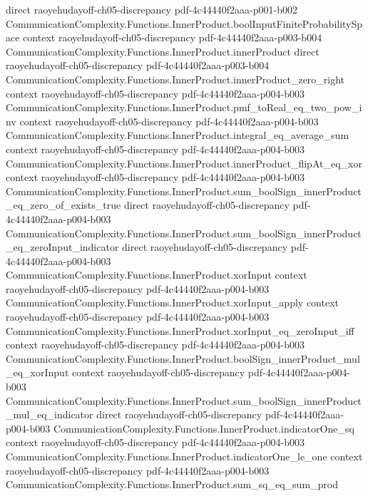 \begin{lemma}
  {direct}
  {raoyehudayoff-ch05-discrepancy}
  {pdf-4c44440f2aaa-p001-b002}
\proofstep
  {CommunicationComplexity.Functions.InnerProduct.boolInputFiniteProbabilitySpace}
  {context}
  {raoyehudayoff-ch05-discrepancy}
  {pdf-4c44440f2aaa-p003-b004}
\proofstep
  {CommunicationComplexity.Functions.InnerProduct.innerProduct}
  {direct}
  {raoyehudayoff-ch05-discrepancy}
  {pdf-4c44440f2aaa-p003-b004}
\proofstep
  {CommunicationComplexity.Functions.InnerProduct.innerProduct_zero_right}
  {context}
  {raoyehudayoff-ch05-discrepancy}
  {pdf-4c44440f2aaa-p004-b003}
\proofstep
  {CommunicationComplexity.Functions.InnerProduct.pmf_toReal_eq_two_pow_inv}
  {context}
  {raoyehudayoff-ch05-discrepancy}
  {pdf-4c44440f2aaa-p004-b003}
\proofstep
  {CommunicationComplexity.Functions.InnerProduct.integral_eq_average_sum}
  {context}
  {raoyehudayoff-ch05-discrepancy}
  {pdf-4c44440f2aaa-p004-b003}
\proofstep
  {CommunicationComplexity.Functions.InnerProduct.innerProduct_flipAt_eq_xor}
  {context}
  {raoyehudayoff-ch05-discrepancy}
  {pdf-4c44440f2aaa-p004-b003}
\proofstep
  {CommunicationComplexity.Functions.InnerProduct.sum_boolSign_innerProduct_eq_zero_of_exists_true}
  {direct}
  {raoyehudayoff-ch05-discrepancy}
  {pdf-4c44440f2aaa-p004-b003}
\proofstep
  {CommunicationComplexity.Functions.InnerProduct.sum_boolSign_innerProduct_eq_zeroInput_indicator}
  {direct}
  {raoyehudayoff-ch05-discrepancy}
  {pdf-4c44440f2aaa-p004-b003}
\proofstep
  {CommunicationComplexity.Functions.InnerProduct.xorInput}
  {context}
  {raoyehudayoff-ch05-discrepancy}
  {pdf-4c44440f2aaa-p004-b003}
\proofstep
  {CommunicationComplexity.Functions.InnerProduct.xorInput_apply}
  {context}
  {raoyehudayoff-ch05-discrepancy}
  {pdf-4c44440f2aaa-p004-b003}
\proofstep
  {CommunicationComplexity.Functions.InnerProduct.xorInput_eq_zeroInput_iff}
  {context}
  {raoyehudayoff-ch05-discrepancy}
  {pdf-4c44440f2aaa-p004-b003}
\proofstep
  {CommunicationComplexity.Functions.InnerProduct.boolSign_innerProduct_mul_eq_xorInput}
  {context}
  {raoyehudayoff-ch05-discrepancy}
  {pdf-4c44440f2aaa-p004-b003}
\proofstep
  {CommunicationComplexity.Functions.InnerProduct.sum_boolSign_innerProduct_mul_eq_indicator}
  {direct}
  {raoyehudayoff-ch05-discrepancy}
  {pdf-4c44440f2aaa-p004-b003}
\proofstep
  {CommunicationComplexity.Functions.InnerProduct.indicatorOne_sq}
  {context}
  {raoyehudayoff-ch05-discrepancy}
  {pdf-4c44440f2aaa-p004-b003}
\proofstep
  {CommunicationComplexity.Functions.InnerProduct.indicatorOne_le_one}
  {context}
  {raoyehudayoff-ch05-discrepancy}
  {pdf-4c44440f2aaa-p004-b003}
\proofstep
  {CommunicationComplexity.Functions.InnerProduct.sum_sq_eq_sum_prod}

\end{lemma}
